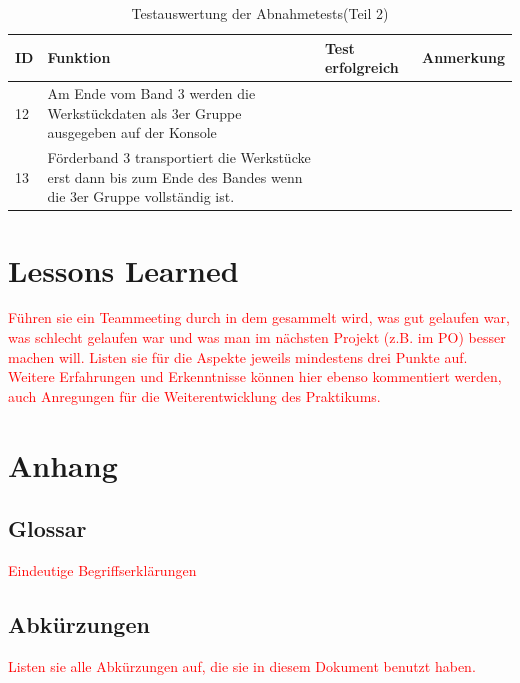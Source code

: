 \documentclass[a4paper, 11pt]{article}
\begin{document}
\newpage

\begin{table}[h]
\center
\begin{tabularx}{\textwidth}{|l|X|X|X|}
\hline
\textbf{ID}&\textbf{Funktion}&\textbf{Test erfolgreich}&\textbf{Anmerkung}\\
\hline

12&Am Ende vom Band 3 werden die Werkstückdaten als 3er Gruppe ausgegeben auf der Konsole&&\\
\hline
13&Förderband 3 transportiert die Werkstücke erst dann bis zum Ende des Bandes wenn die 3er Gruppe vollständig ist.&&\\
\hline
\end{tabularx}
\caption{Testauswertung der Abnahmetests(Teil 2)}
\label{tstl2}
\end{table}

\section{Lessons Learned}
\textcolor{red}{Führen sie ein Teammeeting durch in dem gesammelt wird, was gut gelaufen war, was schlecht gelaufen war und was man im nächsten Projekt (z.B. im PO) besser machen will. Listen sie für die Aspekte jeweils mindestens drei Punkte auf. Weitere Erfahrungen und Erkenntnisse können hier ebenso kommentiert werden, auch Anregungen für die Weiterentwicklung des Praktikums.}

\section{Anhang}

\subsection{Glossar}
\textcolor{red}{Eindeutige Begriffserklärungen}

\subsection{Abkürzungen}
\textcolor{red}{Listen sie alle Abkürzungen auf, die sie in diesem Dokument benutzt haben.}
\end{document}
